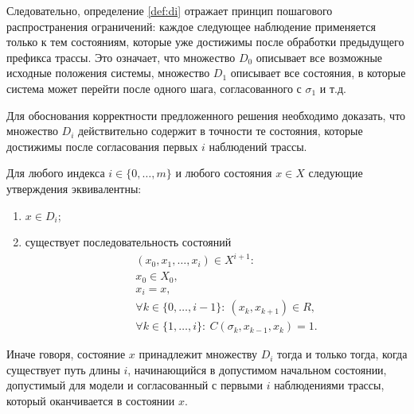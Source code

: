 Следовательно, определение \ref{def:di} отражает принцип пошагового
распространения ограничений: каждое следующее наблюдение применяется только к
тем состояниям, которые уже достижимы после обработки предыдущего префикса
трассы. Это означает, что множество $D_0$ описывает все возможные исходные
положения системы, множество $D_1$ описывает все состояния, в которые система
может перейти после одного шага, согласованного с $\sigma_1$ и т.д.

Для обоснования корректности предложенного решения необходимо доказать, что
множество $D_i$ действительно содержит в точности те состояния, которые
достижимы после согласования первых $i$ наблюдений трассы.

\begin{proposition}\label{prop:Di}
Для любого индекса $i \in \{0,\dots,m\}$ и любого состояния $x \in X$
следующие утверждения эквивалентны:
\begin{enumerate}
    \item $x \in D_i$;
    \item существует последовательность состояний
     \[
     \begin{aligned}
     &\quad(x_0,x_1,\dots,x_i)\in X^{i+1} :\\
     &\quad x_0\in X_0,\\
     &\quad x_i = x,\\
     &\quad\forall k\in\{0,\dots,i-1\}:\ (x_k,x_{k+1})\in R,\\
     &\quad\forall k\in\{1,\dots,i\}:\ C(\sigma_k,x_{k-1},x_k)=1.
     \end{aligned}
     \]
\end{enumerate}
\end{proposition}

Иначе говоря, состояние $x$ принадлежит множеству $D_i$ тогда и только тогда,
когда существует путь длины $i$, начинающийся в допустимом начальном состоянии,
допустимый для модели и согласованный с первыми $i$ наблюдениями трассы,
который оканчивается в состоянии $x$.

